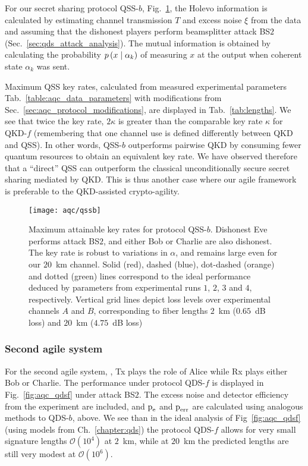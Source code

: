 For our secret sharing protocol QSS-$b$, Fig.~\ref{fig:aqc_qssb}, the Holevo information is calculated by estimating channel transmission $T$ and excess noise $\xi$ from the data and assuming that the dishonest players perform beamsplitter attack BS$2$ (Sec.~\ref{sec:qds_attack_analysis}). The mutual information is obtained by calculating the probability $p\left(x \; \middle| \; \alpha_k\right)$ of measuring $x$ at the output when coherent state $\alpha_k$ was sent.%

Maximum QSS key rates, calculated from measured experimental parameters Tab.~\ref{table:aqc_data_parameters} with modifications from Sec.~\ref{sec:aqc_protocol_modifications}, are displayed in Tab.~\ref{tab:lengths}. We see that twice the key rate, $2 \kappa$ is greater than the comparable key rate $\kappa$ for QKD-$f$ (remembering that one channel use is defined differently between QKD and QSS). In other words, QSS-$b$ outperforms pairwise QKD by consuming fewer quantum resources to obtain an equivalent key rate. We have observed therefore that a ``direct'' QSS can outperform the classical unconditionally secure secret sharing mediated by QKD. This is thus another case where our agile framework is preferable to the QKD-assisted crypto-agility.

\begin{figure}[htp]
\captionsetup{width=0.8\linewidth}
\centering
\texttt{[image: aqc/qssb]}
\caption{\label{fig:aqc_qssb} Maximum attainable key rates for protocol QSS-$b$. Dishonest Eve performs attack BS$2$, and either Bob or Charlie are also dishonest. The key rate is robust to variations in $\alpha$, and remains large even for our $20$~km channel. Solid (red), dashed (blue), dot-dashed (orange) and dotted (green) lines correspond to the ideal performance deduced by parameters from experimental runs $1$, $2$, $3$ and $4$, respectively. Vertical grid lines depict loss levels over experimental channels $A$ and $B$, corresponding to fiber lengths $2$~km ($0.65$~dB loss) and $20$~km ($4.75$~dB loss)}
\end{figure}

\subsubsection{Second agile system \systemF}
For the second agile system, \systemF, Tx plays the role of Alice while Rx plays either Bob or Charlie. The performance under protocol QDS-$f$ is displayed in Fig.~\ref{fig:aqc_qdsf} under attack BS$2$. The excess noise and detector efficiency from the experiment are included, and $\text{p}_{\text{e}}$ and $\text{p}_{\text{err}}$ are calculated using analogous methods to QDS-$b$, above. We see than in the ideal analysis of Fig~\ref{fig:aqc_qdsf} (using models from Ch.~\ref{chapter:qds}) the protocol QDS-$f$ allows for very small signature lengths $\mathcal{O}\left(10^4\right)$ at $2$~km, while at $20$~km the predicted lengths are still very modest at $\mathcal{O}\left(10^6\right)$.

